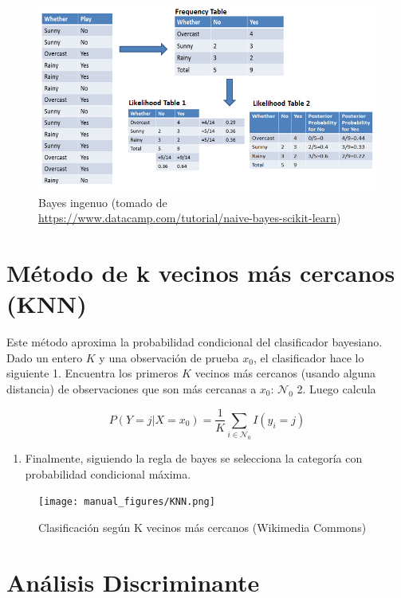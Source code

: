 \documentclass[
  12pt,
]{book}
\providecommand{\tightlist}{%
  \setlength{\itemsep}{0pt}\setlength{\parskip}{0pt}}
\begin{document}
\begin{figure}
\centering
\includegraphics{manual_figures/naivebayes.png}
\caption{Bayes ingenuo (tomado de
\url{https://www.datacamp.com/tutorial/naive-bayes-scikit-learn})}
\end{figure}

\hypertarget{muxe9todo-de-k-vecinos-muxe1s-cercanos-knn}{%
\section{Método de k vecinos más cercanos
(KNN)}\label{muxe9todo-de-k-vecinos-muxe1s-cercanos-knn}}

Este método aproxima la probabilidad condicional del clasificador
bayesiano. Dado un entero \(K\) y una observación de prueba \(x_0\), el
clasificador hace lo siguiente 1. Encuentra los primeros \(K\) vecinos
más cercanos (usando alguna distancia) de observaciones que son más
cercanas a \(x_0\): \(\mathcal N_0\) 2. Luego calcula

\[P(Y=j|X=x_0) = \frac{1}{K}\sum_{i \in \mathcal N_0}I(y_i=j)\]

\begin{enumerate}
\def\labelenumi{\arabic{enumi}.}
\setcounter{enumi}{2}
\tightlist
\item
  Finalmente, siguiendo la regla de bayes se selecciona la categoría con
  probabilidad condicional máxima.
\end{enumerate}

\begin{figure}
\centering
\texttt{[image: manual\_figures/KNN.png]}
\caption{Clasificación según K vecinos más cercanos (Wikimedia Commons)}
\end{figure}

\hypertarget{anuxe1lisis-discriminante}{%
\section{Análisis Discriminante}\label{anuxe1lisis-discriminante}}
\end{document}
